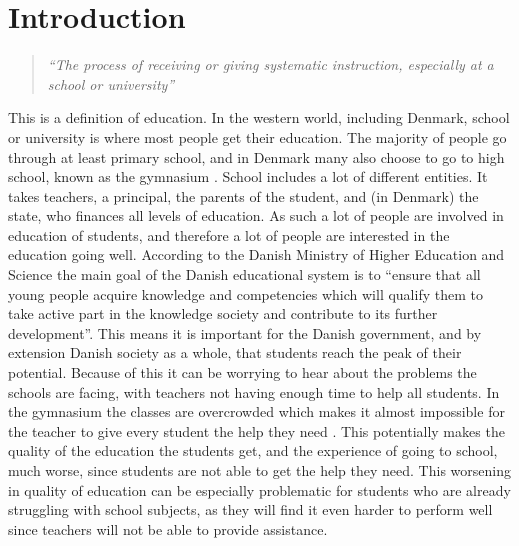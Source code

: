 \chapter{Introduction}\label{ch:introduction}
\setcounter{page}{1}

\begin{quote}
\textit{\enquote{The process of receiving or giving systematic instruction, especially at a school or university}} \cite{EducationDictionaries}
\end{quote}
This is a definition of education. In the western world, including Denmark, school or university is where most people get their education. The majority of people go through at least primary school, and in Denmark many also choose to go to high school, known as the gymnasium \cite{2017FortsatUndervisningsministeriet}. School includes a lot of different entities. It takes teachers, a principal, the parents of the student, and (in Denmark) the state, who finances all levels of education. As such a lot of people are involved in education of students, and therefore a lot of people are interested in the education going well.
\newline\newline
According to the Danish Ministry of Higher Education and Science \cite{MinistryofHigherEducationandScience2018PrinciplesForskningsministeriet} the main goal of the Danish educational system is to \enquote{ensure that all young people acquire knowledge and competencies which will qualify them to take active part in the knowledge society and contribute to its further development}. This means it is important for the Danish government, and by extension Danish society as a whole, that students reach the peak of their potential. Because of this it can be worrying to hear about the problems the schools are facing, with teachers not having enough time to help all students. In the gymnasium the classes are overcrowded which makes it almost impossible for the teacher to give every student the help they need \cite{Romme-Mlby2018GymnasierGymnasieskolen}. 
\newline\newline
This potentially makes the quality of the education the students get, and the experience of going to school, much worse, since students are not able to get the help they need. This worsening in quality of education can be especially problematic for students who are already struggling with school subjects, as they will find it even harder to perform well since teachers will not be able to provide assistance. 
